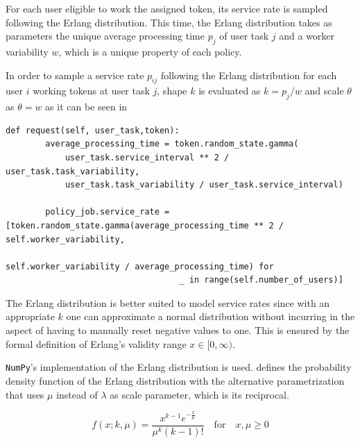 For each user eligible to work the assigned token, its service rate is sampled following the Erlang distribution. This time, the Erlang distribution takes as parameters the unique average processing time $p_j$ of user task $j$ and a worker variability $w$, which is a unique property of each policy.

In order to sample a service rate $p_{ij}$ following the Erlang distribution for each user $i$ working tokens at user task $j$, shape $k$ is evaluated as $k=p_j/w$ and scale $\theta$ as $\theta = w$ as it can be seen in 

\begin{lstlisting}[caption=User service rate sampling following an Erlang distribution,label=lst:user_service_rate,style=CustomPython]
    def request(self, user_task,token):
        average_processing_time = token.random_state.gamma(
            user_task.service_interval ** 2 / user_task.task_variability,
            user_task.task_variability / user_task.service_interval)

        policy_job.service_rate = [token.random_state.gamma(average_processing_time ** 2 / self.worker_variability,
                                                           self.worker_variability / average_processing_time) for
                                   _ in range(self.number_of_users)]
\end{lstlisting}

The Erlang distribution is better suited to model service rates since with an appropriate $k$ one can approximate a normal distribution without incurring in the aspect of having to manually reset negative values to one. This is ensured by the formal definition of Erlang's validity range $x \in [0,\infty)$.

\texttt{NumPy}'s implementation of the Erlang distribution is used.  defines the probability density function of the Erlang distribution with the alternative parametrization that uses $\mu$ instead of $\lambda$ as scale parameter, which is its reciprocal.

\begin{equation}
\label{eq:erlang_density}
	f(x;k,\mu) = \frac{x^{k-1} e^{-\frac{x}{\mu}}}{\mu^k (k-1)!} \quad \text{for} \quad x,\mu \geq 0
\end{equation}